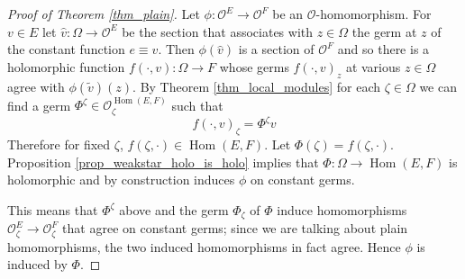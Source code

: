 \documentclass{amsart}
\numberwithin{equation}{section}
\theoremstyle{definition}
\theoremstyle{plain}
\theoremstyle{remark}
\begin{document}
\begin{proof}[Proof of Theorem \ref{thm_plain}]
Let $\phi:{\ensuremath{\mathcal{{O}}}}^E\rightarrow{\ensuremath{\mathcal{{O}}}}^F$ be an ${\ensuremath{\mathcal{{O}}}}$-homomorphism.
For $v\in E$ let $\hat v:\Omega\rightarrow{\ensuremath{\mathcal{{O}}}}^E$ be the section that
associates with $z\in\Omega$ the germ at $z$ of the constant function $e\equiv v$.
Then $\phi(\hat v)$ is a section of ${\ensuremath{\mathcal{{O}}}}^F$ and so there is a 
holomorphic function $f(\cdot,v):\Omega\rightarrow F$ whose
germs $f(\cdot,v)_z$ at various $z\in\Omega$ agree with 
$\phi(\tilde v)(z)$. By Theorem \ref{thm_local_modules} for each
$\zeta\in\Omega$  we can find a germ $\Phi^\zeta\in{\ensuremath{\mathcal{{O}}}}^{{{\mathop{\mathrm{Hom}}}}(E,F)}_\zeta$
 such that 
\[
f(\cdot,v)_\zeta=\Phi^\zeta v
\]
Therefore for fixed $\zeta$, $f(\zeta,\cdot)\in{{\mathop{\mathrm{Hom}}}}(E,F)$.
Let $\Phi(\zeta)=f(\zeta,\cdot)$. Proposition \ref{prop_weakstar_holo_is_holo}
implies that $\Phi:\Omega\rightarrow{{\mathop{\mathrm{Hom}}}}(E,F)$ is holomorphic and by construction
induces $\phi$ on constant germs.

This means that $\Phi^\zeta$ above and the germ $\Phi_\zeta$ of $\Phi$
induce homomorphisms ${\ensuremath{\mathcal{{O}}}}^E_\zeta\rightarrow{\ensuremath{\mathcal{{O}}}}^F_\zeta$
that agree on constant germs; since we are talking about plain homomorphisms, the
two induced homomorphisms in fact agree. Hence $\phi$ is induced by $\Phi$.
\end{proof}
\end{document}
